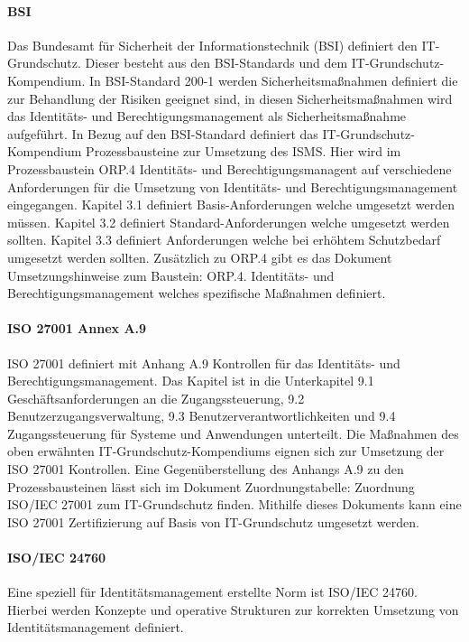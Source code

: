 \documentclass[12pt]{article}
\begin{document}
\paragraph{BSI}
Das Bundesamt für Sicherheit der Informationstechnik (BSI) definiert den IT-Grundschutz. Dieser besteht aus den BSI-Standards und dem IT-Grundschutz-Kompendium. In BSI-Standard 200-1 werden Sicherheitsmaßnahmen definiert die zur Behandlung der Risiken geeignet sind, in diesen Sicherheitsmaßnahmen wird das Identitäts- und Berechtigungsmanagement als Sicherheitsmaßnahme aufgeführt. In Bezug auf den BSI-Standard definiert das IT-Grundschutz-Kompendium Prozessbausteine zur Umsetzung des ISMS. Hier wird im Prozessbaustein \glqq{}ORP.4 Identitäts- und Berechtigungsmanagent\grqq{} auf verschiedene Anforderungen für die Umsetzung von Identitäts- und Berechtigungsmanagement eingegangen. Kapitel 3.1 definiert Basis-Anforderungen welche umgesetzt werden müssen. Kapitel 3.2 definiert Standard-Anforderungen welche umgesetzt werden sollten. Kapitel 3.3 definiert Anforderungen welche bei erhöhtem Schutzbedarf umgesetzt werden sollten. Zusätzlich zu ORP.4 gibt es das Dokument \glqq{}Umsetzungshinweise zum Baustein: ORP.4. Identitäts- und Berechtigungsmanagement\grqq{} welches spezifische Maßnahmen definiert.~\cite{orp4}
\paragraph{ISO 27001 Annex A.9}
ISO 27001 definiert mit Anhang A.9 Kontrollen für das Identitäts- und Berechtigungsmanagement. Das Kapitel ist in die Unterkapitel \glqq{}9.1 Geschäftsanforderungen an die Zugangssteuerung\grqq{}, \glqq{}9.2 Benutzerzugangsverwaltung\grqq{}, \glqq{}9.3 Benutzerverantwortlichkeiten\grqq{} und \glqq{}9.4 Zugangssteuerung für Systeme und Anwendungen\grqq{} unterteilt. Die Maßnahmen des oben erwähnten IT-Grundschutz-Kompendiums eignen sich zur Umsetzung der ISO 27001 Kontrollen. Eine Gegenüberstellung des Anhangs A.9 zu den Prozessbausteinen lässt sich im Dokument \glqq{}Zuordnungstabelle: Zuordnung ISO/IEC 27001 zum IT-Grundschutz\grqq{} finden. Mithilfe dieses Dokuments kann eine ISO 27001 Zertifizierung auf Basis von IT-Grundschutz umgesetzt werden.~\cite{bsi2023basis}
\paragraph{ISO/IEC 24760}
Eine speziell für Identitätsmanagement erstellte Norm ist ISO/IEC 24760. Hierbei werden Konzepte und operative Strukturen zur korrekten Umsetzung von Identitätsmanagement definiert.~\cite{isoiec24760}
\end{document}
